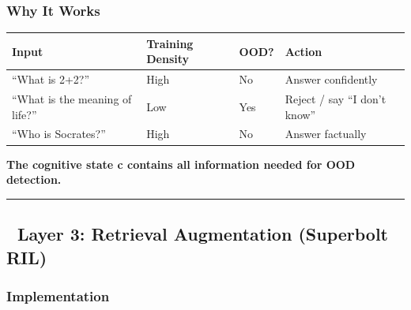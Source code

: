 \documentclass[
  11pt,
  a4paper,
]{article}
\begin{document}
\subsubsection{Why It Works}\label{why-it-works-1}

\begin{longtable}[]{@{}
  >{\raggedright\arraybackslash}p{}
  >{\raggedright\arraybackslash}p{}
  >{\raggedright\arraybackslash}p{}
  >{\raggedright\arraybackslash}p{}@{}}
\toprule\noalign{}
\begin{minipage}[b]{\linewidth}\raggedright
Input
\end{minipage} & \begin{minipage}[b]{\linewidth}\raggedright
Training Density
\end{minipage} & \begin{minipage}[b]{\linewidth}\raggedright
OOD?
\end{minipage} & \begin{minipage}[b]{\linewidth}\raggedright
Action
\end{minipage} \\
\midrule\noalign{}
\endhead
\bottomrule\noalign{}
\endlastfoot
``What is 2+2?'' & High & No & Answer confidently \\
``What is the meaning of life?'' & Low & Yes & Reject / say ``I don't
know'' \\
``Who is Socrates?'' & High & No & Answer factually \\
\end{longtable}

\textbf{The cognitive state c contains all information needed for OOD
detection.}

\begin{center}\rule{0.5\linewidth}{0.5pt}\end{center}

\subsection{🧩 Layer 3: Retrieval Augmentation (Superbolt
RIL)}\label{layer-3-retrieval-augmentation-superbolt-ril}

\subsubsection{Implementation}\label{implementation-2}
\end{document}
